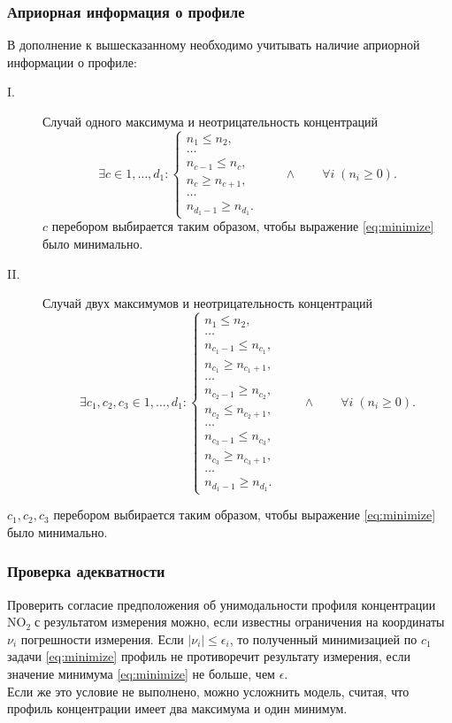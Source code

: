\documentclass[a4paper,14pt]{article}
\theoremstyle{plain}
\theoremstyle{definition}
\theoremstyle{remark}
\newcommand{\nl}{\\ \indent}
\newcommand{\no}{$\text{NO}_2 \;$}
\begin{document}
\subsubsection{Априорная информация о профиле}
В дополнение к вышесказанному необходимо учитывать наличие 
априорной информации о профиле:
\begin{description}
\item[I.] Случай одного максимума и неотрицательность
концентраций
$$\exists c \in {1, \ldots, d_1}:
\begin{cases}
n_1 \leq n_2, \\
\ldots \\
n_{c-1} \leq n_{c}, \\
n_{c} \geq n_{c+1}, \\
\ldots \\
n_{d_1 - 1} \geq n_{d_1}.
\end{cases}
\qquad \wedge \qquad \forall i \;  (n_i \geq 0).$$
$c$ перебором выбирается таким образом, чтобы выражение
\eqref{eq:minimize} было минимально.
\item[II.] Случай двух максимумов и 
неотрицательность концентраций
$$\exists c_1, c_2, c_3 \in {1, \ldots, d_1}:
\begin{cases}
n_1 \leq n_2, \\
\ldots \\
n_{c_1-1} \leq n_{c_1}, \\
n_{c_1} \geq n_{c_1+1}, \\
\ldots \\
n_{c_2-1} \geq n_{c_2}, \\
n_{c_2} \leq n_{c_2+1}, \\
\ldots \\
n_{c_3-1} \leq n_{c_3}, \\
n_{c_3} \geq n_{c_3+1}, \\
\ldots \\
n_{d_1 - 1} \geq n_{d_1}.
\end{cases}
\qquad \wedge \qquad \forall i \;  (n_i \geq 0).$$ 
\end{description}
$c_1, c_2, c_3$ перебором выбирается таким образом, 
чтобы выражение \eqref{eq:minimize} было минимально.
\subsubsection{Проверка адекватности}
Проверить согласие предположения об унимодальности профиля
концентрации \no с результатом измерения можно, если известны
ограничения на координаты $\nu_i$ погрешности измерения. 
Если $|\nu_i| \leq \epsilon_i$, то полученный минимизацией
по $c_1$ задачи \eqref{eq:minimize} профиль не противоречит
результату измерения, если значение минимума \eqref{eq:minimize}
не больше, чем $\epsilon$.
\nl 
Если же это условие не выполнено, можно усложнить модель, 
считая, что профиль концентрации имеет два максимума и один
минимум.
\end{document}
